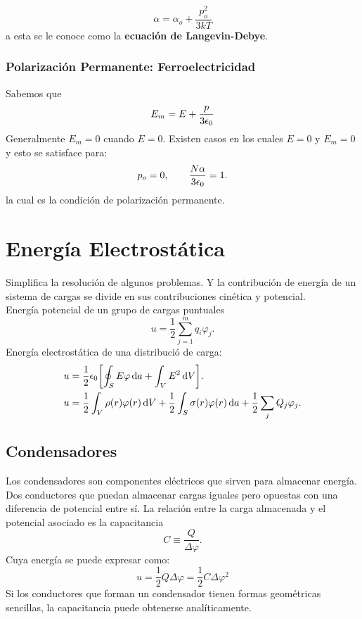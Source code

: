 \begin{equation}
	\alpha = \alpha _o + \frac{p_o ^2}{3kT}
\end{equation}
a esta se le conoce como la \textbf{ecuación de Langevin-Debye}.

\subsection{Polarización Permanente: Ferroelectricidad}
Sabemos que
\begin{equation}
	E_m = E + \frac{p}{3\epsilon_0}
\end{equation}
Generalmente $E_m = 0$ cuando $E = 0$. Existen casos en los cuales $E = 0$ y $E_m = 0$ y esto se satisface para:
\begin{equation}
	p_o = 0, \qquad \frac{N \alpha}{3\epsilon_0} = 1.
\end{equation}
la cual es la condición de polarización permanente.






\chapter{Energía Electrostática}
Simplifica la resolución de algunos problemas. Y la contribución de energía de un sistema de cargas se divide en sus contribuciones cinética y potencial. \\
Energía potencial de un grupo de cargas puntuales
\begin{equation}
	u = \frac{1}{2} \sum _{j=1} ^{m} q_i \varphi _j.
\end{equation}
Energía electrostática de una distribució de carga:
\begin{align*}
	u &= \frac{1}{2} \epsilon_0 \qty[\oint _S E\varphi \dd{a} + \int _V E^2 \dd{V}]. \\
	u &= \frac{1}{2} \int _V \rho (r) \varphi (r) \dd{V} + \frac{1}{2} \int _S \sigma (r) \varphi (r) \dd{a} + \frac{1}{2} \sum _j Q_j \varphi _j.
\end{align*}



\section{Condensadores}
Los condensadores son componentes eléctricos que sirven para almacenar energía. Dos conductores que puedan almacenar cargas iguales pero opuestas con una diferencia de potencial entre sí. La relación entre la carga almacenada y el potencial asociado es la capacitancia
\begin{equation}
	C \equiv \frac{Q}{\Delta \varphi}.
\end{equation}
Cuya energía se puede expresar como:
\begin{equation}
	u = \frac{1}{2} Q \Delta \varphi = \frac{1}{2} C \Delta \varphi ^2
\end{equation}
Si los conductores que forman un condensador tienen formas geométricas sencillas, la capacitancia puede obtenerse analíticamente. \\

